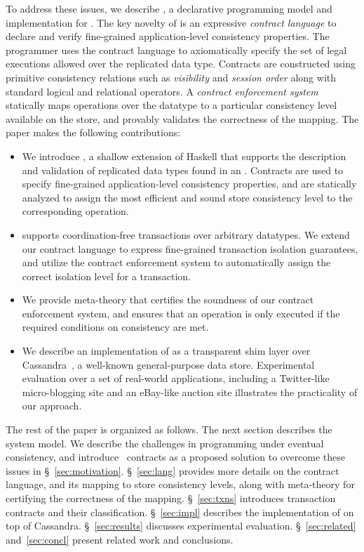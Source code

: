 To address these issues, we describe \name, a declarative programming model and
implementation for \ecds. The key
novelty of \name is an expressive \emph{contract language} to declare and
verify fine-grained application-level consistency properties. The programmer
uses the contract language to axiomatically specify the set of legal executions
allowed over the replicated data type. Contracts are constructed using
primitive consistency relations such as \emph{visibility} and \emph{session
order} along with standard logical and relational operators. A \emph{contract
enforcement system} statically maps operations over the datatype to a
particular consistency level available on the store, and provably validates the
correctness of the mapping. The paper makes the following contributions:

\begin{itemize}
\item We introduce \name, a shallow extension of Haskell that supports the
  description and validation of replicated data types found in an
  \ecds. Contracts are used to specify fine-grained application-level
  consistency properties, and are statically analyzed to assign the most
  efficient and sound store consistency level to the corresponding
  operation.
\item \name supports coordination-free transactions over arbitrary datatypes.
	We extend our contract language to express fine-grained transaction isolation
	guarantees, and utilize the contract enforcement system to automatically
	assign the correct isolation level for a transaction.
\item We provide meta-theory that certifies the soundness of our contract
	enforcement system, and ensures that an operation is only executed if the
	required conditions on consistency are met.
\item We describe an implementation of \name as a transparent shim layer over
	Cassandra~\cite{Cassandra}, a well-known general-purpose data store.
	Experimental evaluation over a set of real-world applications, including a
	Twitter-like micro-blogging site and an eBay-like auction site illustrates
	the practicality of our approach.
\end{itemize}

\noindent The rest of the paper is organized as follows. The next section
describes the system model.  We describe the challenges in programming under
eventual consistency, and introduce \name\ contracts as a proposed solution to
overcome these issues in \S~\ref{sec:motivation}. \S~\ref{sec:lang} provides
more details on the contract language, and its mapping to store consistency
levels, along with meta-theory for certifying the correctness of the mapping.
\S~\ref{sec:txns} introduces transaction contracts and their classification.
\S~\ref{sec:impl} describes the implementation of \name on top of Cassandra.
\S~\ref{sec:results} discusses experimental evaluation. \S~\ref{sec:related}
and~\ref{sec:concl} present related work and conclusions.

